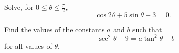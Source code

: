 \documentclass[a4paper,12pt]{exam}
\begin{document}
\begin{questions}

\question[3]
	Solve, for ${0 \leq \theta \leq \frac{\pi}{2},}$
    $$\cos 2 \theta  + 5 \sin \theta  - 3 = 0.$$
\droppoints


\question[3]
	Find the values of the constants ${a}$ and
    ${b}$ such that
    $$- \sec^2 \theta - 9 = a\tan^2 \theta + b$$
    for all values of ${\theta.}$
\droppoints



\end{questions}

\newpage
\end{document}
